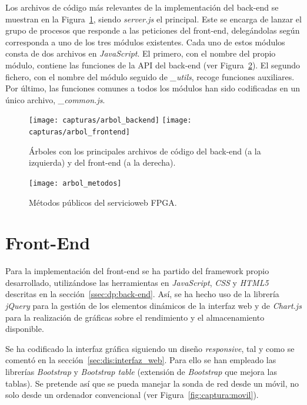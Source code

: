 Los archivos de código más relevantes de la implementación del \gls{back-end} se muestran en la Figura~\ref{fig:arbol_codigo}, siendo \textit{server.js} el principal.
Este se encarga de lanzar el grupo de procesos que responde a las peticiones del \gls{front-end}, delegándolas según corresponda a uno de los tres módulos existentes.
Cada uno de estos módulos consta de dos archivos en \textit{JavaScript}.
El primero, con el nombre del propio módulo, contiene las funciones de la \gls{API} del \gls{back-end} (ver Figura~\ref{fig:arbol_metodos}).
El segundo fichero, con el nombre del módulo seguido de \textit{\_utils}, recoge funciones auxiliares.
Por último, las funciones comunes a todos los módulos han sido codificadas en un único archivo, \textit{\_common.js}.

\begin{figure}[!htp]
  \begin{center}
    \texttt{[image: capturas/arbol\_backend]}
    \hspace{1cm}
    \texttt{[image: capturas/arbol\_frontend]}
  \caption{Árboles con los principales archivos de código del \gls{back-end} (a la izquierda) y del \gls{front-end} (a la derecha).}
  \label{fig:arbol_codigo}
  \end{center}
\end{figure}

\begin{figure}[!htp]
  \centering
  \texttt{[image: arbol\_metodos]}
  \caption{Métodos públicos del \gls{servicioweb} \gls{FPGA}.}
  \label{fig:arbol_metodos}
\end{figure}

\section{Front-End\label{sec:imp:front_end}}

Para la implementación del \gls{front-end} se ha partido del \gls{framework} propio desarrollado, utilizándose las herramientas en \textit{JavaScript}, \textit{CSS} y \textit{HTML5} descritas en la sección~\ref{ssec:dp:back-end}.
Así, se ha hecho uso de la librería \textit{jQuery} para la gestión de los elementos dinámicos de la interfaz web y de \textit{Chart.js} para la realización de gráficas sobre el rendimiento y el almacenamiento disponible.

Se ha codificado la interfaz gráfica siguiendo un diseño \textit{responsive}, tal y como se comentó en la sección~\ref{sec:dis:interfaz_web}.
Para ello se han empleado las librerías \textit{Bootstrap} y \textit{Bootstrap table} (extensión de \textit{Bootstrap} que mejora las tablas).
Se pretende así que se pueda manejar la sonda de red desde un móvil, no solo desde un ordenador convencional (ver Figura~\ref{fig:captura:movil}).

